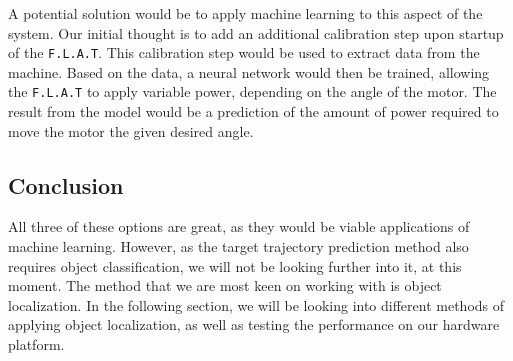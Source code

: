 A potential solution would be to apply machine learning to this aspect of the system.
Our initial thought is to add an additional calibration step upon startup of the \texttt{F.L.A.T}.
This calibration step would be used to extract data from the machine.
Based on the data, a neural network would then be trained, allowing the \texttt{F.L.A.T} to apply variable power, depending on the angle of the motor.
The result from the model would be a prediction of the amount of power required to move the motor the given desired angle.

\subsection{Conclusion}\label{Design:MI:sub:conclusion}
All three of these options are great, as they would be viable applications of machine learning.
However, as the target trajectory prediction method also requires object classification, we will not be looking further into it, at this moment.
The method that we are most keen on working with is object localization.
In the following section, we will be looking into different methods of applying object localization, as well as testing the performance on our hardware platform.
